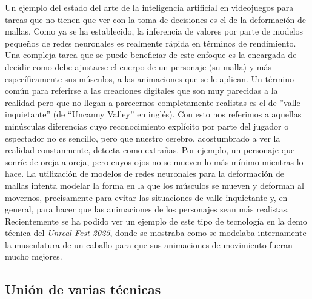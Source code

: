 Un ejemplo del estado del arte de la inteligencia artificial en videojuegos para tareas que no tienen que ver con la toma de decisiones es el de la deformación de mallas. Como ya se ha establecido, la inferencia de valores por parte de modelos pequeños de redes neuronales es realmente rápida en términos de rendimiento. Una compleja tarea que se puede beneficiar de este enfoque es la encargada de decidir como debe ajustarse el cuerpo de un personaje (su malla) y más específicamente sus músculos, a las animaciones que se le aplican. Un término común para referirse a las creaciones digitales que son muy parecidas a la realidad pero que no llegan a parecernos completamente realistas es el de ''valle inquietante'' (de ``Uncanny Valley'' en inglés). Con esto nos referimos a aquellas minúsculas diferencias cuyo reconocimiento explícito por parte del jugador o espectador no es sencillo, pero que nuestro cerebro, acostumbrado a ver la realidad constanmente, detecta como extrañas. Por ejemplo, un personaje que sonríe de oreja a oreja, pero cuyos ojos no se mueven lo más mínimo mientras lo hace. La utilización de modelos de redes neuronales para la deformación de mallas intenta modelar la forma en la que los músculos se mueven y deforman al movernos, precisamente para evitar las situaciones de valle inquietante y, en general, para hacer que las animaciones de los personajes sean más realistas. Recientemente se ha podido ver un ejemplo de este tipo de tecnología en la demo técnica del \textit{Unreal Fest 2025}, donde se mostraba como se modelaba internamente la musculatura de un caballo para que sus animaciones de movimiento fueran mucho mejores.

\subsection{Unión de varias técnicas}

